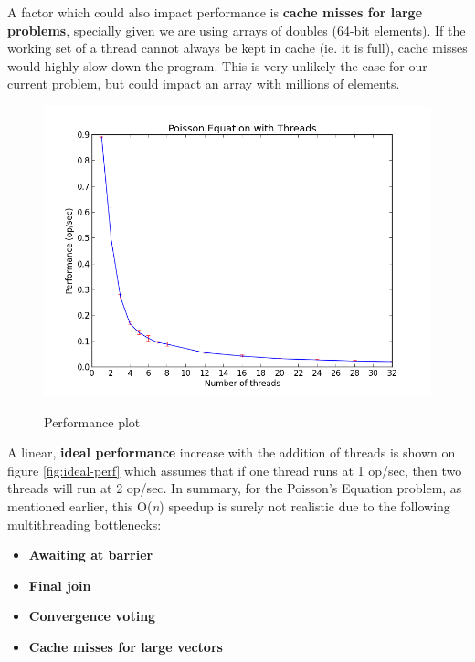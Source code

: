 \documentclass{article}
\begin{document}
A factor which could also impact performance is \textbf{cache misses for large problems}, specially given we are using arrays of doubles (64-bit elements). If the working set of a thread cannot always be kept in cache (ie. it is full), cache misses would highly slow down the program. This is very unlikely the case for our current problem, but could impact an array with millions of elements.

\begin{figure}
  \centering
  \caption{Performance plot}
  \includegraphics[width=0.8\linewidth, natwidth=800, natheight=600]{graphs/performance.png}
  \label{fig:perf}
\end{figure}

A linear, \textbf{ideal performance} increase with the addition of threads is shown on figure \ref{fig:ideal-perf} which assumes that if one thread runs at 1 op/sec, then two threads will run at 2 op/sec. In summary, for the Poisson's Equation problem, as mentioned earlier, this O(\textit{n}) speedup is surely not realistic due to the following multithreading bottlenecks:

\begin{itemize}
\setlength\itemsep{0.35em}
  \item \textbf{Awaiting at barrier}
  \item \textbf{Final join}
  \item \textbf{Convergence voting}
  \item \textbf{Cache misses for large vectors}
\end{itemize}
\end{document}
